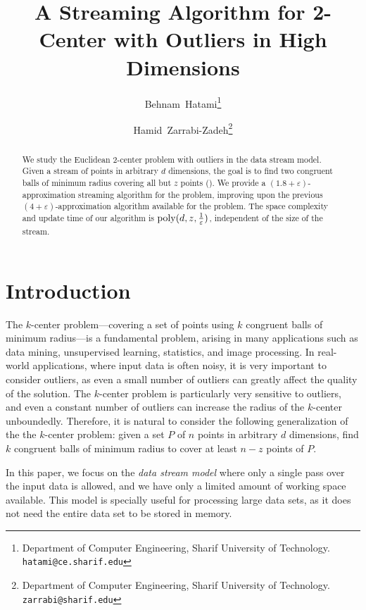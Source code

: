 \documentclass[envcountsame]{cls/cccg15}
\title{A Streaming Algorithm for 2-Center with Outliers in High Dimensions}
\author{Behnam~Hatami\thanks{Department of Computer Engineering, 
	Sharif University of Technology.
	{\tt hatami@ce.sharif.edu}}
	\and 
	Hamid~Zarrabi-Zadeh\thanks{Department of Computer Engineering, 
	Sharif University of Technology.
	{\tt zarrabi@sharif.edu}}
}
\newcommand{\poly}{\mathop{\mathrm{poly}}}
\newcommand{\eps}{\varepsilon}
\begin{document}
\maketitle
\pagestyle{plain}


\begin{abstract}
We study the Euclidean 2-center problem with outliers in the data stream model. 
Given a stream of points in arbitrary $d$ dimensions, the goal is to find two congruent balls 
of minimum radius covering all but $z$ points (). 
We provide a $(1.8+\eps)$-approximation streaming algorithm for the problem, 
improving upon the previous $(4 + \eps)$-approximation algorithm available for the problem.
The space complexity and update time of our algorithm is $\poly(d, z, {1 \over \eps})$,
independent of the size of the stream.
\end{abstract}


\section{Introduction}
The $k$-center problem---covering a set of points 
using $k$ congruent balls of minimum radius---is a fundamental problem,
arising in many applications 
such as data mining, unsupervised learning, statistics, and image processing.
In real-world applications, where input data is often noisy, 
it is very important to consider outliers, 
as even a small number of outliers can greatly affect the quality of the solution.
The $k$-center problem is particularly very sensitive to outliers,
and even a constant number of outliers can increase the radius of the $k$-center unboundedly.
Therefore, it is natural to consider the following generalization of
the the $k$-center problem: %
given a set $P$ of $n$ points in arbitrary $d$ dimensions, 
find $k$ congruent balls of minimum radius 
to cover at least $n - z$ points of $P$.

In this paper, we focus on the \emph{data stream model}
where only a single pass over the input data is allowed,
and we have only a limited amount of working space available.
This model is specially useful for processing large data sets,
as it does not need the entire data set to be stored in memory.
\end{document}
